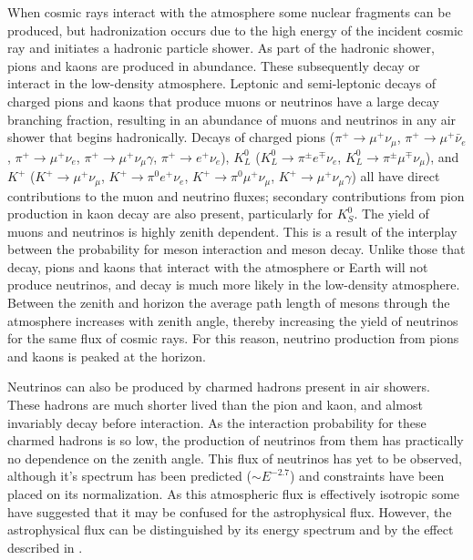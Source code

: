 When cosmic rays interact with the atmosphere some nuclear fragments can be produced, but hadronization occurs due to the high energy of the incident cosmic ray and initiates a hadronic particle shower.
As part of the hadronic shower, pions and kaons are produced in abundance.
These subsequently decay or interact in the low-density atmosphere.
Leptonic and semi-leptonic decays of charged pions and kaons that produce muons or neutrinos have a large decay branching fraction, resulting in an abundance of muons and neutrinos in any air shower that begins hadronically.
Decays of charged pions ($\pi^+\rightarrow\mu^+\nu_\mu$, $\pi^+\rightarrow\mu^+\bar{\nu}_e$, $\pi^+\rightarrow\mu^+\nu_e$, $\pi^+\rightarrow\mu^+\nu_\mu \gamma$, $\pi^+\rightarrow e^+\nu_e$), $K_L^0$ ($K_L^0 \rightarrow \pi^\pm e^\mp \nu_e$, $K_L^0 \rightarrow \pi^\pm \mu^\mp \nu_\mu$), and $K^+$ ($K^+\rightarrow \mu^+ \nu_\mu$, $K^+\rightarrow \pi^0 e^+ \nu_e$, $K^+\rightarrow \pi^0 \mu^+ \nu_\mu$, $K^+\rightarrow \mu^+ \nu_\mu \gamma$) all have direct contributions to the muon and neutrino fluxes; secondary contributions from pion production in kaon decay are also present, particularly for $K_S^0$.
The yield of muons and neutrinos is highly zenith dependent.
This is a result of the interplay between the probability for meson interaction and meson decay.
Unlike those that decay, pions and kaons that interact with the atmosphere or Earth will not produce neutrinos, and decay is much more likely in the low-density atmosphere.
Between the zenith and horizon the average path length of mesons through the atmosphere increases with zenith angle, thereby increasing the yield of neutrinos for the same flux of cosmic rays.
For this reason, neutrino production from pions and kaons is peaked at the horizon.

Neutrinos can also be produced by charmed hadrons present in air showers.
These hadrons are much shorter lived than the pion and kaon, and almost invariably decay before interaction.
As the interaction probability for these charmed hadrons is so low, the production of neutrinos from them has practically no dependence on the zenith angle.
This flux of neutrinos has yet to be observed, although it's spectrum has been predicted ($\sim E^{-2.7}$) and constraints have been placed on its normalization.
As this atmospheric flux is effectively isotropic some have suggested that it may be confused for the astrophysical flux.
However, the astrophysical flux can be distinguished by its energy spectrum and by the effect described in .

